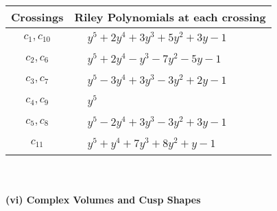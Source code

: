 \documentclass[1p]{elsarticle_modified}
\theoremstyle{definition}
\begin{document}
\begin{tabular}{m{50pt}|m{274pt}}
Crossings & \hspace{64pt}Riley Polynomials at each crossing \\
\hline $$\begin{aligned}c_{1},c_{10}\end{aligned}$$&$\begin{aligned}
&y^5+2 y^4+3 y^3+5 y^2+3 y-1
\end{aligned}$\\
\hline $$\begin{aligned}c_{2},c_{6}\end{aligned}$$&$\begin{aligned}
&y^5+2 y^4- y^3-7 y^2-5 y-1
\end{aligned}$\\
\hline $$\begin{aligned}c_{3},c_{7}\end{aligned}$$&$\begin{aligned}
&y^5-3 y^4+3 y^3-3 y^2+2 y-1
\end{aligned}$\\
\hline $$\begin{aligned}c_{4},c_{9}\end{aligned}$$&$\begin{aligned}
&y^5
\end{aligned}$\\
\hline $$\begin{aligned}c_{5},c_{8}\end{aligned}$$&$\begin{aligned}
&y^5-2 y^4+3 y^3-3 y^2+3 y-1
\end{aligned}$\\
\hline $$\begin{aligned}c_{11}\end{aligned}$$&$\begin{aligned}
&y^5+y^4+7 y^3+8 y^2+y-1
\end{aligned}$\\
\hline
\end{tabular}\\~\\
\newpage\flushleft \textbf{(vi) Complex Volumes and Cusp Shapes}
\end{document}
